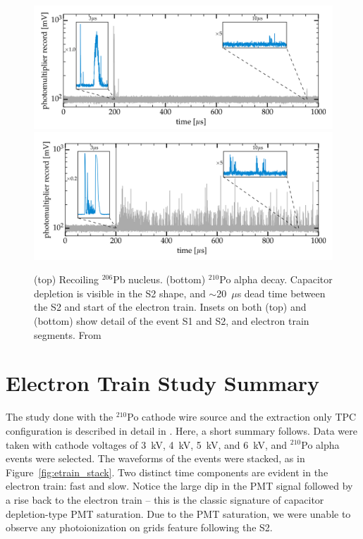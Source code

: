 \begin{figure}[htbp]
\begin{center}
\includegraphics[width=\textwidth]{figures/etrains/event_pb_recoil.png}
\includegraphics[width=\textwidth]{figures/etrains/event_po_alpha.png}
\caption{ (top) Recoiling $^{206}$Pb nucleus. (bottom)  $^{210}$Po alpha decay. Capacitor depletion is visible in the S2 shape, and $\sim$20~$\mu$s dead time between the S2 and start of the electron train. Insets on both (top) and (bottom) show detail of the event S1 and S2, and electron train segments. From \cite{SorensenKamdin2018} }
\label{fig:po_pbrecoil_examples}
\end{center}
\end{figure}


\section{Electron Train Study Summary}
The study done with the $^{210}$Po cathode wire source and the extraction only \ac{TPC} configuration is described in detail in \cite{SorensenKamdin2018}. Here, a short summary follows. Data were taken with cathode voltages of 3~kV, 4~kV, 5~kV, and 6~kV, and $^{210}$Po alpha events were selected. The waveforms of the events were stacked, as in Figure~\ref{fig:etrain_stack}. Two distinct time components are evident in the electron train: fast and slow. Notice the large dip in the \ac{PMT} signal followed by a rise back to the electron train -- this is the classic signature of capacitor depletion-type \ac{PMT} saturation. Due to the \ac{PMT} saturation, we were unable to observe any photoionization on grids feature following the S2.

